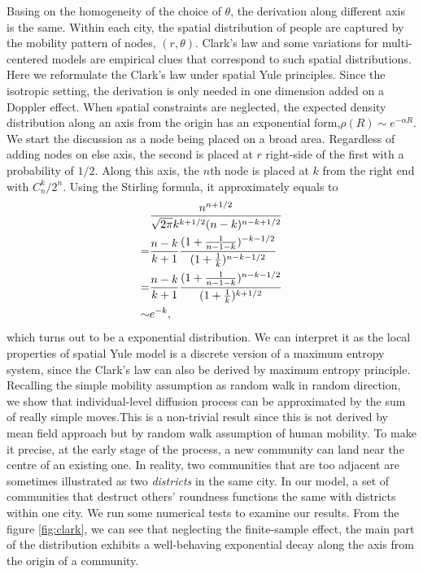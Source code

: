 \documentclass[aps,prl]{revtex4-2}
\begin{document}
Basing on the homogeneity of the choice of $\theta$, the derivation along different axis is the same. Within each city, the spatial distribution of people are captured by the mobility pattern of nodes, $(r,\theta)$. Clark's law\cite{clark1951urban} and some variations for multi-centered models\cite{griffith1981modelling} are empirical clues that correspond to such spatial distributions. Here we reformulate the Clark's law under spatial Yule principles. Since the isotropic setting, the derivation is only needed in one dimension added on a Doppler effect. When spatial constraints are neglected, the expected density distribution along an axis from the origin has an exponential form,$\rho (R)\sim e^{-\alpha R}$. We start the discussion as a node being placed on a broad area. Regardless of adding nodes on else axis, the second is placed at $r$ right-side of the first with a probability of $1/2$. Along this axis, the $n$th node is placed at $k$ from the right end with $C_n^k/2^n$. Using the Stirling formula, it approximately equals to \begin{align}
    & \frac{n^{n+1/2}}{\sqrt{2\pi}k^{k+1/2}(n-k)^{n-k+1/2}}\notag                         \\
=    & \frac{n-k}{k+1}\frac{(1+\frac{1}{n-1-k})^{-k-1/2}}{(1+\frac{1}{k})^{n-k-1/2}}\notag \\
=    & \frac{n-k}{k+1}\frac{(1+\frac{1}{n-1-k})^{n-k-1/2}}{(1+\frac{1}{k})^{k+1/2}}\notag  \\
\sim & e^{-k},
\end{align}
which turns out to be a exponential distribution. We can interpret it as the local properties of spatial Yule model is a discrete version of a maximum entropy system, since the Clark's law can also be derived by maximum entropy principle\cite{merity2009accurate}. Recalling the simple mobility assumption as random walk in random direction, we show that individual-level diffusion process can be approximated by the sum of really simple moves.This is a non-trivial result since this is not derived by mean field approach but by random walk assumption of human mobility. To make it precise, at the early stage of the process, a new community can land near the centre of an existing one. In reality, two communities that are too adjacent are sometimes illustrated as two \emph{districts} in the same city. In our model, a set of communities that destruct others' roundness functions the same with districts within one city. We run some numerical tests to examine our results. From the figure \ref{fig:clark}, we can see that neglecting the finite-sample effect, the main part of the distribution exhibits a well-behaving exponential decay along the axis from the origin of a community.
\end{document}
